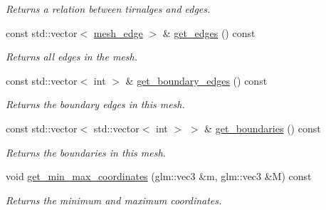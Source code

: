 \begin{DoxyCompactItemize}
\begin{DoxyCompactList}\small\item\em Returns a relation between tirnalges and edges. \end{DoxyCompactList}\item 
const std\+::vector$<$ \hyperlink{classgeoproc_1_1mesh__edge}{mesh\+\_\+edge} $>$ \& \hyperlink{classgeoproc_1_1TriangleMesh_a742e5769cb3e26303eb8ec1af57c9ac4}{get\+\_\+edges} () const
\begin{DoxyCompactList}\small\item\em Returns all edges in the mesh. \end{DoxyCompactList}\item 
const std\+::vector$<$ int $>$ \& \hyperlink{classgeoproc_1_1TriangleMesh_a0cf960fcf069954b51ce567304359d4e}{get\+\_\+boundary\+\_\+edges} () const
\begin{DoxyCompactList}\small\item\em Returns the boundary edges in this mesh. \end{DoxyCompactList}\item 
const std\+::vector$<$ std\+::vector$<$ int $>$ $>$ \& \hyperlink{classgeoproc_1_1TriangleMesh_a07a91ab963592c2560eec6409194ba66}{get\+\_\+boundaries} () const
\begin{DoxyCompactList}\small\item\em Returns the boundaries in this mesh. \end{DoxyCompactList}\item 
void \hyperlink{classgeoproc_1_1TriangleMesh_a00f918f8d96560f640efd244fd273cec}{get\+\_\+min\+\_\+max\+\_\+coordinates} (glm\+::vec3 \&m, glm\+::vec3 \&M) const
\begin{DoxyCompactList}\small\item\em Returns the minimum and maximum coordinates. \end{DoxyCompactList}\end{DoxyCompactItemize}
